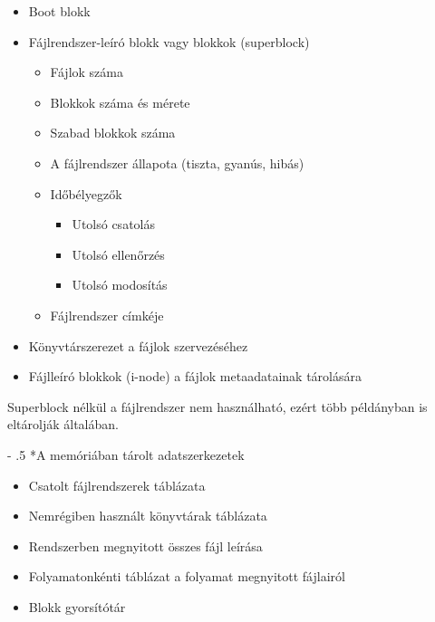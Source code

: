 \documentclass[tikz,12pt,margin=0px]{article}
\makeatletter
\renewcommand\paragraph{%
	\@startsection{paragraph}{4}{0mm}%
	{-\baselineskip}%
	{.5\baselineskip}%
	{\normalfont\normalsize\bfseries}}
\makeatother
\begin{document}
    \begin{itemize}[topsep=8pt,itemsep=4pt,partopsep=4pt, parsep=4pt]
        \item Boot blokk
        \item Fájlrendszer-leíró blokk vagy blokkok (superblock)
        \begin{itemize}[topsep=8pt,itemsep=4pt,partopsep=4pt, parsep=4pt]
            \item Fájlok száma
            \item Blokkok száma és mérete
            \item Szabad blokkok száma
            \item A fájlrendszer állapota (tiszta, gyanús, hibás)
            \item Időbélyegzők
            \begin{itemize}
                \item Utolsó csatolás
                \item Utolsó ellenőrzés
                \item Utolsó modosítás
            \end{itemize}
            \item Fájlrendszer címkéje
        \end{itemize}
        \item Könyvtárszerezet a fájlok szervezéséhez
        \item Fájlleíró blokkok (i-node) a fájlok metaadatainak tárolására
    \end{itemize}

    \noindent Superblock nélkül a fájlrendszer nem használható, ezért több példányban is eltárolják általában.

    \paragraph*{A memóriában tárolt adatszerkezetek\\}
    \begin{itemize}[topsep=8pt,itemsep=4pt,partopsep=4pt, parsep=4pt]
      \item Csatolt fájlrendszerek táblázata
      \item Nemrégiben használt könyvtárak táblázata
      \item Rendszerben megnyitott összes fájl leírása
      \item Folyamatonkénti táblázat a folyamat megnyitott fájlairól
      \item Blokk gyorsítótár
    \end{itemize}
\end{document}
